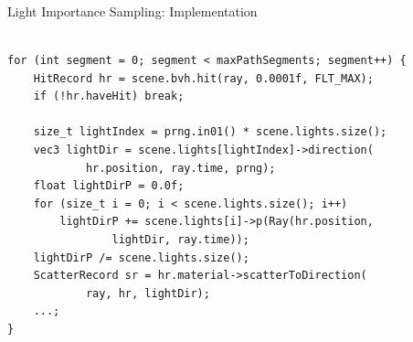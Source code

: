 \documentclass[utf8,stillsansserifmath,fleqn,t]{beamer}
\begin{document}
\begin{frame}[fragile]
\frametitle{\insertsection}
Light Importance Sampling: Implementation\\~\\
\begin{lstlisting}
for (int segment = 0; segment < maxPathSegments; segment++) {
    HitRecord hr = scene.bvh.hit(ray, 0.0001f, FLT_MAX);
    if (!hr.haveHit) break;

    size_t lightIndex = prng.in01() * scene.lights.size();
    vec3 lightDir = scene.lights[lightIndex]->direction(
            hr.position, ray.time, prng);
    float lightDirP = 0.0f;
    for (size_t i = 0; i < scene.lights.size(); i++)
        lightDirP += scene.lights[i]->p(Ray(hr.position,
                lightDir, ray.time));
    lightDirP /= scene.lights.size();
    ScatterRecord sr = hr.material->scatterToDirection(
            ray, hr, lightDir);
    ...;
}
\end{lstlisting}
\end{frame}
\end{document}
